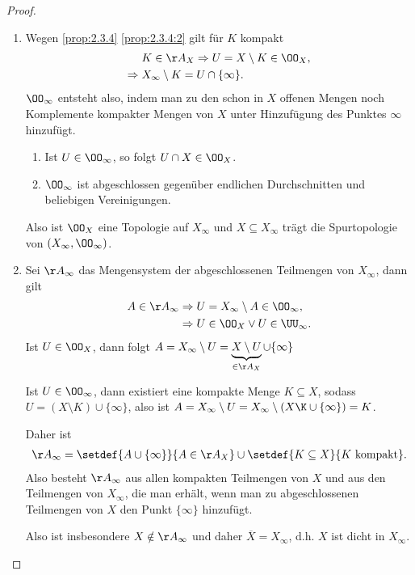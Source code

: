 \begin{proof}
\begin{enumerate}
  \item Wegen \ref{prop:2.3.4} \ref{prop:2.3.4:2} gilt für $K$ kompakt 
\begin{align*}
&K\in\AA_X\Rightarrow U = X\setminus K \in \OO_X,\\
\Rightarrow\;& X_\infty\setminus K = U\cap \{\infty\}.
\end{align*}
$\OO_\infty$ entsteht also, indem man zu den schon in $X$ offenen Mengen noch
Komplemente kompakter Mengen von $X$ unter Hinzufügung des Punktes $\infty$
hinzufügt.
\begin{bemn}[Klar:]
\begin{enumerate}[label=(\alph{*})]
\item Ist $U\in\OO_\infty$, so folgt $U\cap X\in\OO_X$.
\item $\OO_\infty$ ist abgeschlossen gegenüber endlichen Durchschnitten und
beliebigen Vereinigungen.
\end{enumerate}
\end{bemn}

Also ist $\OO_X$ eine Topologie auf $X_\infty$ und $X\subseteq X_\infty$ trägt
die Spurtopologie von $(X_\infty,\OO_\infty)$.
\item Sei $\AA_\infty$ das Mengensystem der abgeschlossenen Teilmengen von
  $X_\infty$, dann gilt
  \begin{align*}
  A\in\AA_\infty &\Rightarrow U=X_\infty \setminus A \in\OO_\infty,\\
  &\Rightarrow U\in\OO_X \lor U\in\UU_\infty.
  \end{align*}
Ist $U\in\OO_X$, dann folgt $A=X_\infty\setminus U = \underbrace{X\setminus
U}_{\in\AA_X} \cup \{\infty\}$

Ist $U\in\OO_\infty$, dann existiert eine kompakte Menge
$K\subseteq X$, sodass $U=(X\setminus K)\cup\{\infty\}$, also ist
$A = X_\infty\setminus U = X_\infty \setminus (X\K \cup \{\infty\}) = K$.

Daher ist
\begin{align*}
\AA_\infty = \setdef{A\cup\{\infty\}}{A\in \AA_X}\cup \setdef{K\subseteq
X}{K\text{ kompakt}}.
\end{align*}
Also besteht $\AA_\infty$ aus allen kompakten Teilmengen von $X$ und aus den
Teilmengen von $X_\infty$, die man erhält, wenn man zu abgeschlossenen
Teilmengen von $X$ den Punkt $\{\infty\}$ hinzufügt.

Also ist insbesondere $X\notin \AA_\infty$ und daher $\overline{X}=X_\infty$,
d.h. $X$ ist dicht in $X_\infty$.


\end{enumerate}
\end{proof}
